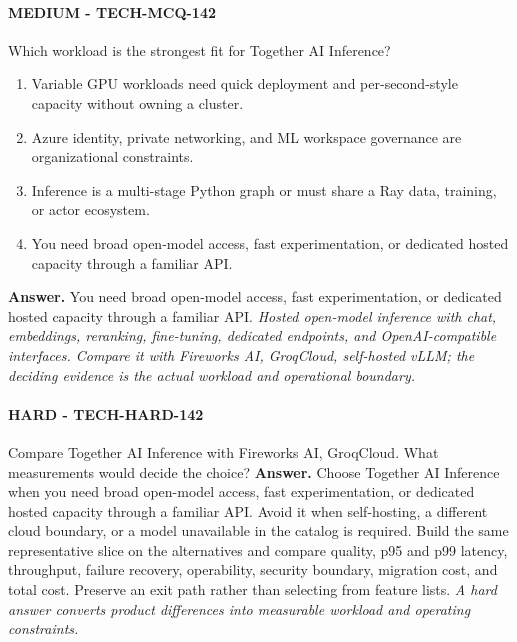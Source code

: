 \paragraph{MEDIUM - TECH-MCQ-142} Which workload is the strongest fit for Together AI Inference?
\begin{enumerate}[label=\Alph*.]
\item Variable GPU workloads need quick deployment and per-second-style capacity without owning a cluster.
\item Azure identity, private networking, and ML workspace governance are organizational constraints.
\item Inference is a multi-stage Python graph or must share a Ray data, training, or actor ecosystem.
\item You need broad open-model access, fast experimentation, or dedicated hosted capacity through a familiar API.
\end{enumerate}
\textbf{Answer.} You need broad open-model access, fast experimentation, or dedicated hosted capacity through a familiar API.
\textit{Hosted open-model inference with chat, embeddings, reranking, fine-tuning, dedicated endpoints, and OpenAI-compatible interfaces. Compare it with Fireworks AI, GroqCloud, self-hosted vLLM; the deciding evidence is the actual workload and operational boundary.}
\paragraph{HARD - TECH-HARD-142} Compare Together AI Inference with Fireworks AI, GroqCloud. What measurements would decide the choice?
\textbf{Answer.} Choose Together AI Inference when you need broad open-model access, fast experimentation, or dedicated hosted capacity through a familiar API. Avoid it when self-hosting, a different cloud boundary, or a model unavailable in the catalog is required. Build the same representative slice on the alternatives and compare quality, p95 and p99 latency, throughput, failure recovery, operability, security boundary, migration cost, and total cost. Preserve an exit path rather than selecting from feature lists.
\textit{A hard answer converts product differences into measurable workload and operating constraints.}
